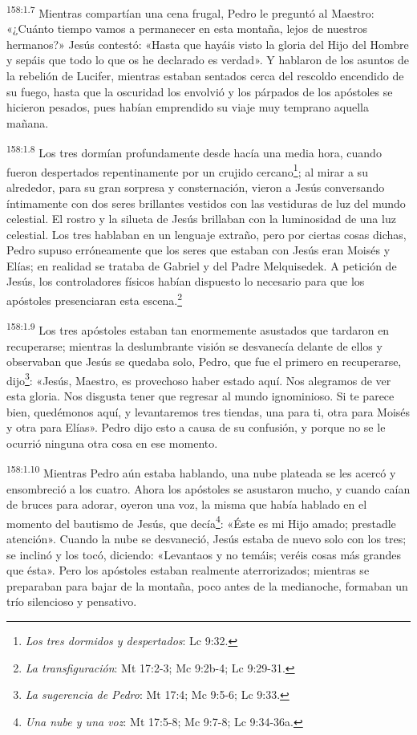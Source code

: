 \par
\textsuperscript{158:1.7} Mientras compartían una cena frugal, Pedro le preguntó al Maestro: «¿Cuánto tiempo vamos a permanecer en esta montaña, lejos de nuestros hermanos?» Jesús contestó: «Hasta que hayáis visto la gloria del Hijo del Hombre y sepáis que todo lo que os he declarado es verdad». Y hablaron de los asuntos de la rebelión de Lucifer, mientras estaban sentados cerca del rescoldo encendido de su fuego, hasta que la oscuridad los envolvió y los párpados de los apóstoles se hicieron pesados, pues habían emprendido su viaje muy temprano aquella mañana.

\par
\textsuperscript{158:1.8} Los tres dormían profundamente desde hacía una media hora, cuando fueron despertados repentinamente por un crujido cercano\footnote{\textit{Los tres dormidos y despertados}: Lc 9:32.}; al mirar a su alrededor, para su gran sorpresa y consternación, vieron a Jesús conversando íntimamente con dos seres brillantes vestidos con las vestiduras de luz del mundo celestial. El rostro y la silueta de Jesús brillaban con la luminosidad de una luz celestial. Los tres hablaban en un lenguaje extraño, pero por ciertas cosas dichas, Pedro supuso erróneamente que los seres que estaban con Jesús eran Moisés y Elías; en realidad se trataba de Gabriel y del Padre Melquisedek. A petición de Jesús, los controladores físicos habían dispuesto lo necesario para que los apóstoles presenciaran esta escena.\footnote{\textit{La transfiguración}: Mt 17:2-3; Mc 9:2b-4; Lc 9:29-31.}

\par
\textsuperscript{158:1.9} Los tres apóstoles estaban tan enormemente asustados que tardaron en recuperarse; mientras la deslumbrante visión se desvanecía delante de ellos y observaban que Jesús se quedaba solo, Pedro, que fue el primero en recuperarse, dijo\footnote{\textit{La sugerencia de Pedro}: Mt 17:4; Mc 9:5-6; Lc 9:33.}: «Jesús, Maestro, es provechoso haber estado aquí. Nos alegramos de ver esta gloria. Nos disgusta tener que regresar al mundo ignominioso. Si te parece bien, quedémonos aquí, y levantaremos tres tiendas, una para ti, otra para Moisés y otra para Elías». Pedro dijo esto a causa de su confusión, y porque no se le ocurrió ninguna otra cosa en ese momento.

\par
\textsuperscript{158:1.10} Mientras Pedro aún estaba hablando, una nube plateada se les acercó y ensombreció a los cuatro. Ahora los apóstoles se asustaron mucho, y cuando caían de bruces para adorar, oyeron una voz, la misma que había hablado en el momento del bautismo de Jesús, que decía\footnote{\textit{Una nube y una voz}: Mt 17:5-8; Mc 9:7-8; Lc 9:34-36a.}: «Éste es mi Hijo amado; prestadle atención». Cuando la nube se desvaneció, Jesús estaba de nuevo solo con los tres; se inclinó y los tocó, diciendo: «Levantaos y no temáis; veréis cosas más grandes que ésta». Pero los apóstoles estaban realmente aterrorizados; mientras se preparaban para bajar de la montaña, poco antes de la medianoche, formaban un trío silencioso y pensativo.

